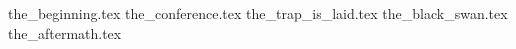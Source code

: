 




{the_beginning.tex}
{the_conference.tex}
{the_trap_is_laid.tex}
{the_black_swan.tex}
{the_aftermath.tex}
